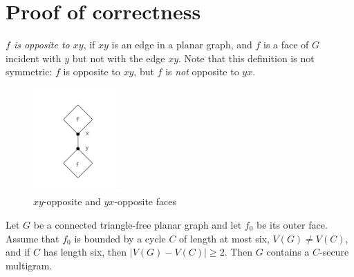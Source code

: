 \section{Proof of correctness}
\begin{definition}
\textit{$f$ is opposite to $xy$}, if $xy$ is an edge in a planar graph, and $f$ is a face of $G$ incident with $y$ but not with the edge $xy$. Note that this definition is not symmetric: $f$ is opposite to $xy$, but $f$ is \textit{not} opposite to $yx$. \cite{dvorak2013threecoloring}
\begin{figure}[H] %
\centering %
\includegraphics[width=0.3\textwidth]{figure/opposite.png} 
\caption{$xy$-opposite and $yx$-opposite faces} %
\label{figure} %
\end{figure}
\end{definition}

\begin{lemma}
Let $G$ be a connected triangle-free planar graph and let $f_0$ be its
outer face. Assume that $f_0$ is bounded by a cycle $C$ of length at most six,
$V(G) \ne V (C)$, and if $C$ has length six, then $|V(G) - V(C)| \geq 2$. Then $G$
contains a $C$-secure multigram. \cite{dvorak2013threecoloring}
\end{lemma}

